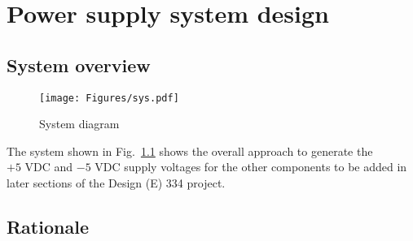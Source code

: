 \chapter{Power supply system design}
\section{System overview} \label{sec:literature_system}

\begin{figure}[h]
    \centering
    \texttt{[image: Figures/sys.pdf]}
    \caption{System diagram}
    \label{fig:system_diagram}
\end{figure}


The system shown in Fig.\ \ref{fig:system_diagram} shows the overall approach to generate the $+5 \text{ VDC}$ and $-5 \text{ VDC}$ supply voltages for the other components to be added in later sections of the Design (E) 334 project.




\section{Rationale}\label{sec:rationale_system}

